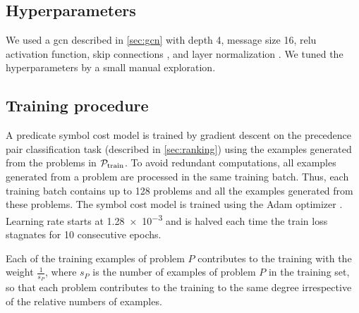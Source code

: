 \subsection{Hyperparameters}

We used a \gls{gcn} described in \cref{sec:gcn}
with depth 4, message size 16, \gls{relu} activation function,
skip connections \cite{Zhou2018}, and layer normalization \cite{Ba2016}.
We tuned the hyperparameters by a small manual exploration.

\subsection{Training procedure}

A predicate symbol cost model is trained by gradient descent
on the precedence pair classification task (described in \cref{sec:ranking})
using the examples generated from the problems in $\operatorname{\mathcal{P}_{\mathrm{train}}}$.
To avoid redundant computations, all examples generated from a problem are processed in the same training batch.
Thus, each training batch contains up to \num{128} problems and all the examples generated from these problems.
The symbol cost model is trained using the Adam optimizer \cite{Kingma2014}.
Learning rate starts at \num{1.28e-3}
and is halved each time the train loss stagnates for 10 consecutive epochs.

Each of the training examples of problem $P$ contributes to the training with the weight $\frac{1}{s_P}$,
where $s_P$ is the number of examples of problem $P$ in the training set,
so that each problem contributes to the training to the same degree irrespective of the relative numbers of examples.


